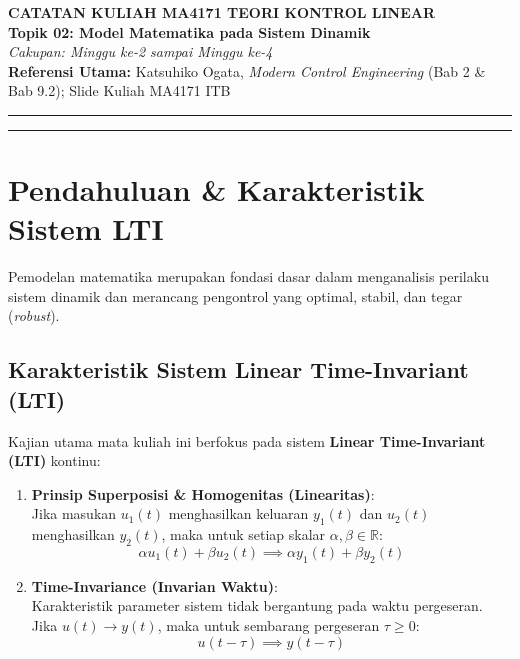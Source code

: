 \documentclass[11pt,a4paper]{article}
\begin{document}
\begin{center}
    {\LARGE \textbf{CATATAN KULIAH MA4171 TEORI KONTROL LINEAR}}\\[6pt]
    {\Large \textbf{Topik 02: Model Matematika pada Sistem Dinamik}}\\[4pt]
    \textit{Cakupan: Minggu ke-2 sampai Minggu ke-4}\\[2pt]
    \textbf{Referensi Utama:} Katsuhiko Ogata, \textit{Modern Control Engineering} (Bab 2 \& Bab 9.2); Slide Kuliah MA4171 ITB
\end{center}
\vspace{-4pt}
\hrule
\vspace{10pt}

\tableofcontents
\vspace{10pt}
\hrule
\vspace{12pt}

\section{Pendahuluan \& Karakteristik Sistem LTI}

Pemodelan matematika merupakan fondasi dasar dalam menganalisis perilaku sistem dinamik dan merancang pengontrol yang optimal, stabil, dan tegar (\textit{robust}).

\subsection{Karakteristik Sistem Linear Time-Invariant (LTI)}
Kajian utama mata kuliah ini berfokus pada sistem \textbf{Linear Time-Invariant (LTI)} kontinu:
\begin{enumerate}
    \item \textbf{Prinsip Superposisi \& Homogenitas (Linearitas)}:\\
    Jika masukan $u_1(t)$ menghasilkan keluaran $y_1(t)$ dan $u_2(t)$ menghasilkan $y_2(t)$, maka untuk setiap skalar $\alpha, \beta \in \mathbb{R}$:
    \begin{equation*}
        \alpha u_1(t) + \beta u_2(t) \implies \alpha y_1(t) + \beta y_2(t)
    \end{equation*}
    \item \textbf{Time-Invariance (Invarian Waktu)}:\\
    Karakteristik parameter sistem tidak bergantung pada waktu pergeseran. Jika $u(t) \to y(t)$, maka untuk sembarang pergeseran $\tau \ge 0$:
    \begin{equation*}
        u(t - \tau) \implies y(t - \tau)
    \end{equation*}
\end{enumerate}
\end{document}
